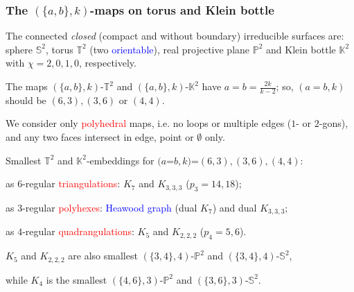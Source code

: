 \documentclass{beamer}
\begin{document}
\begin{frame}\frametitle{The $(\{a,b\},k)$-maps on torus and Klein bottle}
\vspace{-1.5mm}
The connected {\em closed} (compact and without boundary) irreducible 
surfaces
are: sphere $\mathbb{S}^2$, torus $\mathbb{T}^2$ 
(two \textcolor{blue}{orientable}),
real projective 
 plane
 $\mathbb{P}^2$ and Klein bottle $\mathbb{K}^2$ with $\chi=2,0,1,0$, 
respectively.
\vspace{1.5mm}


The maps 
$(\{a,b\},k)$-$\mathbb{T}^2$ and $(\{a,b\},k)$-$\mathbb{K}^2$ 
have
$a=b=\frac{2k}{k-2}$; so, $(a=b,k)$ should be $(6,3),(3,6)$ or $(4,4)$.
\vspace{1mm}

We consider only \textcolor{red}{polyhedral} maps, i.e.
 no loops or multiple edges ($1$- or $2$-gons), and  any two faces 
intersect
 in edge, point  or $\emptyset$ only.
\vspace{1mm}\pause

Smallest  $\mathbb{T}^2$ and $\mathbb{K}^2$-embeddings for 
$(a$=$b,k)$=$(6,3),(3,6),(4,4)$:
\vspace{1mm}

as $6$-regular  \textcolor{red}{triangulations}:  $K_7$ and $K_{3,3,3}$ ($p_3=14,18$);

as $3$-regular  \textcolor{red}{polyhexes}:
\textcolor{blue}{Heawood graph} (dual $K_7$) and dual $K_{3,3,3}$;

as $4$-regular   \textcolor{red}{quadrangulations}:
$K_5$ and
$K_{2,2,2}$ ($p_4=5,6$).
\vspace{1mm}

$K_5$ and $K_{2,2,2}$ are also smallest $(\{3,4\},4)$-$\mathbb{P}^2$ and
$(\{3,4\},4)$-$\mathbb{S}^2$,

while $K_4$ is the smallest $(\{4,6\},3)$-$\mathbb{P}^2$ and
$(\{3,6\},3)$-$\mathbb{S}^2$.
\end{frame}   
\end{document}
